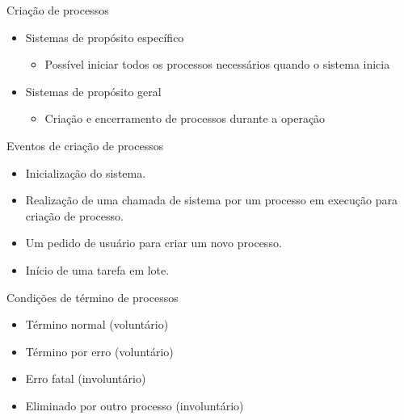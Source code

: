 \documentclass[aspectratio=169,
				xcolor=table]{beamer}
\begin{document}
	\begin{frame}{Criação de processos}
		\begin{itemize}
			\item Sistemas de propósito específico
			\begin{itemize}
				\item Possível iniciar todos os processos necessários quando o sistema inicia
			\end{itemize}
			\vspace{1em}
			\item Sistemas de propósito geral 
			\begin{itemize}
				\item Criação e encerramento de processos durante a operação
			\end{itemize}
		\end{itemize}
	\end{frame}
	

	\begin{frame}{Eventos de criação de processos}
		\begin{itemize}
			\item Inicialização do sistema. 
			\vspace{1em}
			\item Realização de uma chamada de sistema por um processo em execução para criação de processo.
			\vspace{1em} 
			\item Um pedido de usuário para criar um novo processo. 
			\vspace{1em}
			\item Início de uma tarefa em lote.
		\end{itemize}
	\end{frame}
	
	\begin{frame}{Condições de término de processos}
		\begin{itemize}
			\item Término normal (voluntário) 
			\vspace{1em}
			\item Término por erro (voluntário) 
			\vspace{1em}
			\item Erro fatal (involuntário) 
			\vspace{1em}
			\item Eliminado por outro processo (involuntário)
		\end{itemize}
	\end{frame}
\end{document}
